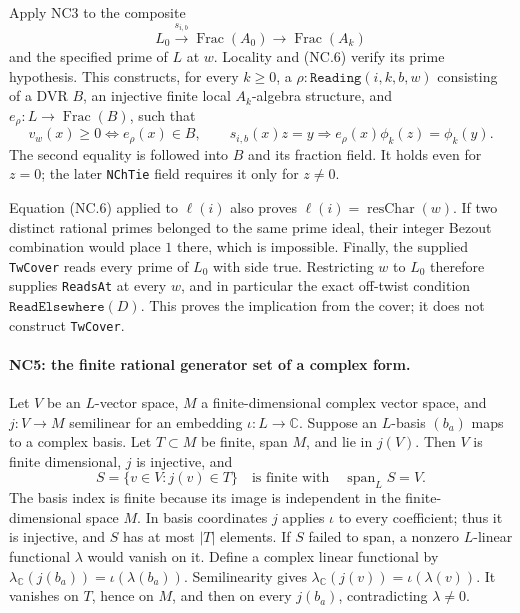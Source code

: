 Apply NC3 to the composite
\[
 L_0\xrightarrow{s_{i,b}}\operatorname{Frac}(A_0)
       \longrightarrow\operatorname{Frac}(A_k)
\]
and the specified prime of \(L\) at \(w\).
Locality and (NC.6) verify its prime hypothesis.
This constructs, for every \(k\geq0\), a
\(\rho:\texttt{Reading}(i,k,b,w)\) consisting of a DVR \(B\),
an injective finite local \(A_k\)-algebra structure, and
\(e_\rho:L\to\operatorname{Frac}(B)\), such that
\[
 v_w(x)\geq0\Longleftrightarrow e_\rho(x)\in B,\qquad
 s_{i,b}(x)z=y\Longrightarrow
 e_\rho(x)\phi_k(z)=\phi_k(y).
 \tag{NC.7}
\]
The second equality is followed into \(B\) and its fraction field.
It holds even for \(z=0\); the later \texttt{NChTie} field
requires it only for \(z\ne0\).

Equation (NC.6) applied to \(\ell(i)\) also proves
\(\ell(i)=\operatorname{resChar}(w)\).
If two distinct rational primes belonged to the same prime
ideal, their integer Bezout combination would place \(1\)
there, which is impossible.
Finally, the supplied \texttt{TwCover} reads every prime of
\(L_0\) with side \(\mathrm{true}\). Restricting \(w\) to \(L_0\)
therefore supplies \texttt{ReadsAt} at every \(w\), and in
particular the exact off-twist condition
\(\texttt{ReadElsewhere}(D)\).
This proves the implication from the cover; it does not
construct \texttt{TwCover}.

\paragraph{NC5: the finite rational generator set of a complex form.}
Let \(V\) be an \(L\)-vector space, \(M\) a finite-dimensional
complex vector space, and \(j:V\to M\) semilinear for an
embedding \(\iota:L\to\mathbb C\).
Suppose an \(L\)-basis \((b_a)\) maps to a complex basis.
Let \(T\subset M\) be finite, span \(M\), and lie in \(j(V)\).
Then \(V\) is finite dimensional, \(j\) is injective, and
\[
 S=\{v\in V:j(v)\in T\}
 \quad\text{is finite with}\quad \operatorname{span}_L S=V.
 \tag{NC.8}
\]
The basis index is finite because its image is independent in
the finite-dimensional space \(M\).
In basis coordinates \(j\) applies \(\iota\) to every coefficient;
thus it is injective, and \(S\) has at most \(|T|\) elements.
If \(S\) failed to span, a nonzero \(L\)-linear functional
\(\lambda\) would vanish on it. Define a complex linear
functional by
\(\lambda_{\mathbb C}(j(b_a))=\iota(\lambda(b_a))\).
Semilinearity gives
\(\lambda_{\mathbb C}(j(v))=\iota(\lambda(v))\).
It vanishes on \(T\), hence on \(M\), and then on every
\(j(b_a)\), contradicting \(\lambda\ne0\).

